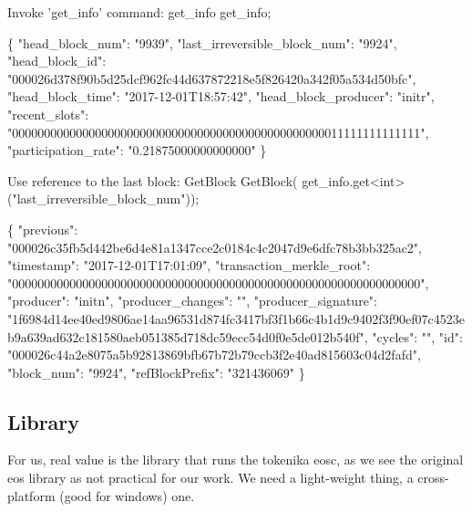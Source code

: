 \begin{DoxyCode}
Invoke 'get\_info' command:
get\_info get\_info;

\{
    "head\_block\_num": "9939",
    "last\_irreversible\_block\_num": "9924",
    "head\_block\_id": "000026d378f90b5d25dcf962fc44d637872218e5f826420a342f05a534d50bfc",
    "head\_block\_time": "2017-12-01T18:57:42",
    "head\_block\_producer": "initr",
    "recent\_slots": "0000000000000000000000000000000000000000000000000011111111111111",
    "participation\_rate": "0.21875000000000000"
\}


Use reference to the last block:
GetBlock GetBlock(
  get\_info.get<int>("last\_irreversible\_block\_num"));

\{
    "previous": "000026c35fb5d442be6d4e81a1347cce2c0184c4c2047d9e6dfc78b3bb325ac2",
    "timestamp": "2017-12-01T17:01:09",
    "transaction\_merkle\_root": "0000000000000000000000000000000000000000000000000000000000000000",
    "producer": "initn",
    "producer\_changes": "",
    "producer\_signature":
       "1f6984d14ee40ed9806ae14aa96531d874fc3417bf3f1b66c4b1d9c9402f3f90ef07c4523eb9a639ad632c181580aeb051385d718dc59ecc54d0f0e5de012b540f",
    "cycles": "",
    "id": "000026c44a2e8075a5b92813869bfb67b72b79ccb3f2e40ad815603c04d2fafd",
    "block\_num": "9924",
    "refBlockPrefix": "321436069"
\}
\end{DoxyCode}
 \subsection*{Library}

For us, real value is the library that runs the {\ttfamily tokenika eosc}, as we see the original eos library as not practical for our work. We need a light-\/weight thing, a cross-\/platform (good for windows) one.

